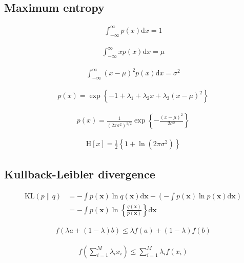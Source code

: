 \documentclass{article}
\begin{document}
\subsection{Maximum entropy}

\begin{align*}
\int_{-\infty}^{\infty} p(x) \mathrm{d} x = 1 
\tag{2.93}
\end{align*}

\begin{align*}
\int_{-\infty}^{\infty} x p(x) \mathrm{d} x = \mu 
\tag{2.94}
\end{align*}

\begin{align*}
\int_{-\infty}^{\infty}(x-\mu)^{2} p(x) \mathrm{d} x = \sigma^{2}
\tag{2.95}
\end{align*}

\begin{align*}
p(x) = \exp \left\{-1 + \lambda_{1} + \lambda_{2} x + \lambda_{3}(x - \mu)^{2}\right\} 
\tag{2.97}
\end{align*}

\begin{align*}
p(x) = \frac{1}{\left(2 \pi \sigma^{2}\right)^{1 / 2}} \exp \left\{-\frac{(x - \mu)^{2}}{2 \sigma^{2}}\right\} 
\tag{2.98}
\end{align*}

\begin{align*}
\mathrm{H}[x] = \frac{1}{2}\left\{1 + \ln \left(2 \pi \sigma^{2}\right)\right\} 
\tag{2.99}
\end{align*}

\subsection{Kullback-Leibler divergence}

\begin{align*}
\mathrm{KL}(p \| q) & =-\int p(\mathbf{x}) \ln q(\mathbf{x}) \mathrm{d} \mathbf{x} -\left(-\int p(\mathbf{x}) \ln p(\mathbf{x}) \mathrm{d} \mathbf{x}\right) \\
& =-\int p(\mathbf{x}) \ln \left\{\frac{q(\mathbf{x})}{p(\mathbf{x})}\right\} \mathrm{d} \mathbf{x}
\tag{2.100}
\end{align*}

\begin{align*}
f(\lambda a + (1 - \lambda) b) \leqslant \lambda f(a) + (1 - \lambda) f(b) 
\tag{2.101}
\end{align*}

\begin{align*}
f\left(\sum_{i=1}^{M} \lambda_{i} x_{i}\right) \leqslant \sum_{i=1}^{M} \lambda_{i} f\left(x_{i}\right) 
\tag{2.102}
\end{align*}
\end{document}
